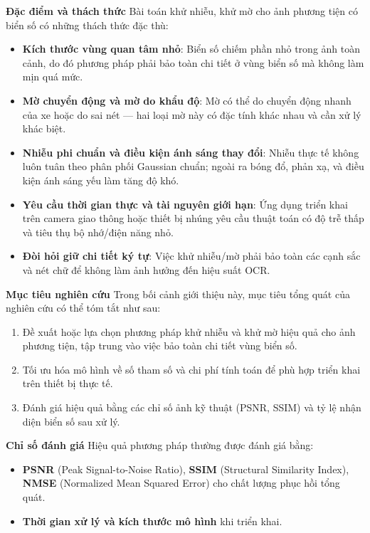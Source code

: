 \textbf{Đặc điểm và thách thức}
Bài toán khử nhiễu, khử mờ cho ảnh phương tiện có biển số có những thách thức đặc thù:
\begin{itemize}
\item \textbf{Kích thước vùng quan tâm nhỏ}: Biển số chiếm phần nhỏ trong ảnh toàn cảnh, do đó phương pháp phải bảo toàn chi tiết ở vùng biển số mà không làm mịn quá mức.
\item \textbf{Mờ chuyển động và mờ do khẩu độ}: Mờ có thể do chuyển động nhanh của xe hoặc do sai nét — hai loại mờ này có đặc tính khác nhau và cần xử lý khác biệt.
\item \textbf{Nhiễu phi chuẩn và điều kiện ánh sáng thay đổi}: Nhiễu thực tế không luôn tuân theo phân phối Gaussian chuẩn; ngoài ra bóng đổ, phản xạ, và điều kiện ánh sáng yếu làm tăng độ khó.
\item \textbf{Yêu cầu thời gian thực và tài nguyên giới hạn}: Ứng dụng triển khai trên camera giao thông hoặc thiết bị nhúng yêu cầu thuật toán có độ trễ thấp và tiêu thụ bộ nhớ/điện năng nhỏ.
\item \textbf{Đòi hỏi giữ chi tiết ký tự}: Việc khử nhiễu/mờ phải bảo toàn các cạnh sắc và nét chữ để không làm ảnh hưởng đến hiệu suất OCR.
\end{itemize}

\textbf{Mục tiêu nghiên cứu}
Trong bối cảnh giới thiệu này, mục tiêu tổng quát của nghiên cứu có thể tóm tắt như sau:
\begin{enumerate}
\item Đề xuất hoặc lựa chọn phương pháp khử nhiễu và khử mờ hiệu quả cho ảnh phương tiện, tập trung vào việc bảo toàn chi tiết vùng biển số.
\item Tối ưu hóa mô hình về số tham số và chi phí tính toán để phù hợp triển khai trên thiết bị thực tế.
\item Đánh giá hiệu quả bằng các chỉ số ảnh kỹ thuật (PSNR, SSIM) và tỷ lệ nhận diện biển số sau xử lý.
\end{enumerate}

\textbf{Chỉ số đánh giá}
Hiệu quả phương pháp thường được đánh giá bằng:
\begin{itemize}
\item \textbf{PSNR} (Peak Signal-to-Noise Ratio), \textbf{SSIM} (Structural Similarity Index), \textbf{NMSE} (Normalized Mean Squared Error) cho chất lượng phục hồi tổng quát.
\item \textbf{Thời gian xử lý và kích thước mô hình} khi triển khai.
\end{itemize}

